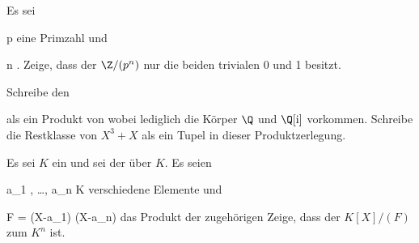 {}
{





Es sei

\mavergleichskette
{\vergleichskette
{ p
}
{ \in }{ \Z
}
{  }{
}
{    }{
}
{   }{
}
}
{}{}{}
eine Primzahl und

\mavergleichskette
{\vergleichskette
{ n
}
{ \in }{ \N
}
{  }{
}
{    }{
}
{   }{
}
}
{}{}{.}
Zeige, dass der
$\Z/(p^n )$ nur die beiden trivialen
\mathkor {} {0} {und} {1} {}
besitzt.





}
{} {}

{}
{





Schreibe den

 als ein Produkt von
wobei lediglich die Körper $\Q$ und $\Q[ { \mathrm i} ]$ vorkommen. Schreibe die Restklasse von $X^3+X$ als ein Tupel in dieser Produktzerlegung.





}
{} {}

{}
{





Es sei $K$ ein
 und sei
 der  über $K$. Es seien

\mavergleichskette
{\vergleichskette
{ a_1 , \ldots , a_n
}
{ \in }{ K
}
{  }{
}
{    }{
}
{   }{
}
}
{}{}{}
verschiedene Elemente und

\mavergleichskettedisp
{\vergleichskette
{ F
}
{ =} { (X-a_1){ \cdots }(X-a_n)
}
{ } {
}
{ } {
}
{ } {
}
}
{}{}{}
das Produkt der zugehörigen
Zeige, dass der
$K[X]/(F)$
zum
$K^n$ ist.





}
{} {}

